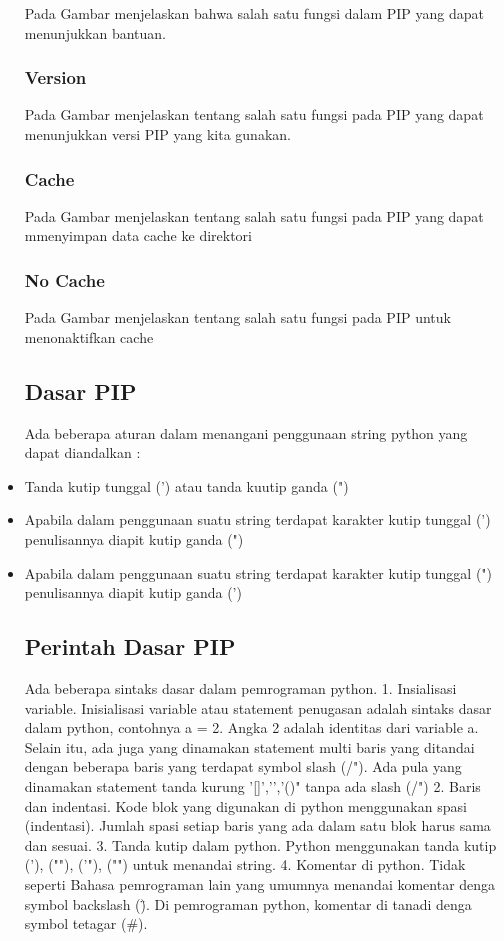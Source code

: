 \begin{itemize}
Pada Gambar menjelaskan bahwa salah satu fungsi dalam PIP yang dapat menunjukkan bantuan.
\subsubsection{Version}
Pada Gambar menjelaskan tentang salah satu fungsi pada PIP yang dapat menunjukkan versi PIP yang kita gunakan.
\subsubsection{Cache}
Pada Gambar menjelaskan tentang salah satu fungsi pada PIP yang dapat mmenyimpan data cache ke direktori %
\subsubsection{No Cache}
Pada Gambar menjelaskan tentang salah satu fungsi pada PIP untuk menonaktifkan cache
\subsection{Dasar PIP}
Ada beberapa aturan dalam menangani penggunaan string python yang dapat diandalkan :
\item Tanda kutip tunggal (') atau tanda kuutip ganda (")
\item Apabila dalam penggunaan suatu string terdapat karakter kutip tunggal (') penulisannya diapit kutip ganda (")
\item Apabila dalam penggunaan suatu string terdapat karakter kutip tunggal (") penulisannya diapit kutip ganda (')
\subsection{Perintah Dasar PIP}
Ada beberapa sintaks dasar dalam pemrograman python.
1.	Insialisasi variable. Inisialisasi variable atau statement penugasan adalah sintaks dasar dalam python, contohnya a = 2. Angka 2 adalah identitas dari variable a. Selain itu, ada juga yang dinamakan statement multi baris yang ditandai dengan beberapa baris yang terdapat symbol slash (/"). Ada pula yang dinamakan statement tanda kurung '[]','{}','()" tanpa ada slash (/")
2.	Baris dan indentasi. Kode blok yang digunakan di python menggunakan spasi (indentasi). Jumlah spasi setiap baris yang ada dalam satu blok harus sama dan sesuai.
3.	Tanda kutip dalam python. Python menggunakan tanda kutip ('), (""), ('"), ("") untuk menandai string.
4.	Komentar di python. Tidak seperti Bahasa pemrograman lain yang umumnya menandai komentar denga symbol backslash (\"). Di pemrograman python, komentar di tanadi denga symbol tetagar (\#).

\end{itemize}

